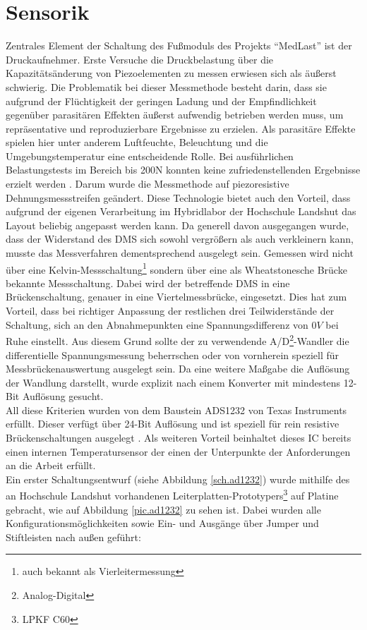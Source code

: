 \documentclass[12pt]{scrreprt} %
\begin{document}
\section{Sensorik}
\label{Sensorik}
Zentrales Element der Schaltung des Fußmoduls des Projekts "`MedLast"' ist der Druckaufnehmer. Erste Versuche die Druckbelastung über die Kapazitätsänderung von Piezoelementen zu messen erwiesen sich als äußerst schwierig. Die Problematik bei dieser Messmethode besteht darin, dass sie aufgrund der Flüchtigkeit der geringen Ladung und der Empfindlichkeit gegenüber parasitären Effekten äußerst aufwendig betrieben werden muss, um repräsentative und reproduzierbare Ergebnisse zu erzielen. Als parasitäre Effekte spielen hier unter anderem Luftfeuchte, Beleuchtung und die Umgebungstemperatur eine entscheidende Rolle. Bei ausführlichen Belastungstests im Bereich bis 200N konnten keine zufriedenstellenden Ergebnisse erzielt werden \citep{Jobstmann2012}. Darum wurde die Messmethode auf piezoresistive Dehnungsmessstreifen geändert. Diese Technologie bietet auch den Vorteil, dass aufgrund der eigenen Verarbeitung im Hybridlabor der Hochschule Landshut das Layout beliebig angepasst werden kann. Da generell davon ausgegangen wurde, dass der Widerstand des DMS sich sowohl vergrößern als auch verkleinern kann, musste das Messverfahren dementsprechend ausgelegt sein. Gemessen wird nicht über eine Kelvin-Messschaltung\footnote{auch bekannt als Vierleitermessung} sondern über eine als Wheatstonesche Brücke bekannte Messschaltung. Dabei wird der betreffende DMS in eine Brückenschaltung, genauer in eine Viertelmessbrücke, eingesetzt. Dies hat zum Vorteil, dass bei richtiger Anpassung der restlichen drei Teilwiderstände der Schaltung, sich an den Abnahmepunkten eine Spannungsdifferenz von $0V$ bei Ruhe einstellt. Aus diesem Grund sollte der zu verwendende A/D\footnote{Analog-Digital}-Wandler die differentielle Spannungsmessung beherrschen oder von vornherein speziell für Messbrückenauswertung ausgelegt sein. Da eine weitere Maßgabe die Auflösung der Wandlung darstellt, wurde explizit nach einem Konverter mit mindestens 12-Bit Auflösung gesucht.\\
All diese Kriterien wurden von dem Baustein ADS1232 von Texas Instruments erfüllt. Dieser verfügt über 24-Bit Auflösung und ist speziell für rein resistive Brückenschaltungen ausgelegt \citep{ADS1232}. Als weiteren Vorteil beinhaltet dieses IC bereits einen internen Temperatursensor der einen der Unterpunkte der Anforderungen an die Arbeit erfüllt.\\
Ein erster Schaltungsentwurf (siehe Abbildung \vref{sch.ad1232}) wurde mithilfe des an Hochschule Landshut vorhandenen Leiterplatten-Prototypers\footnote{LPKF C60} auf Platine gebracht, wie auf Abbildung \vref{pic.ad1232} zu sehen ist. Dabei wurden alle Konfigurationsmöglichkeiten sowie Ein- und Ausgänge über Jumper und Stiftleisten nach außen geführt:
\end{document}
